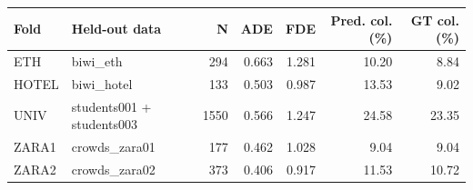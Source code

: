 \begin{tabular}{llrrrrr}
Fold & Held-out data & N & ADE & FDE & Pred. col. (\%) & GT col. (\%) \\
\hline
ETH & biwi_eth & 294 & 0.663 & 1.281 & 10.20 & 8.84 \\
HOTEL & biwi_hotel & 133 & 0.503 & 0.987 & 13.53 & 9.02 \\
UNIV & students001 + students003 & 1550 & 0.566 & 1.247 & 24.58 & 23.35 \\
ZARA1 & crowds_zara01 & 177 & 0.462 & 1.028 & 9.04 & 9.04 \\
ZARA2 & crowds_zara02 & 373 & 0.406 & 0.917 & 11.53 & 10.72 \\
\end{tabular}
